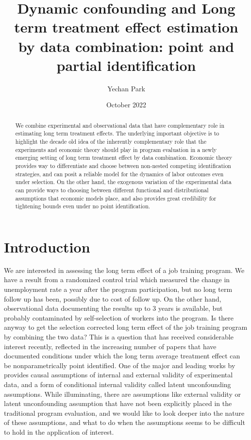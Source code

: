 \documentclass[uplatex,dvipdfmx]{jsarticle}
\title{Dynamic confounding and Long term treatment effect estimation by data combination: point and partial identification}\date{October 2022}\author{Yechan Park}
\begin{document}
\maketitle\tableofcontents
\begin{abstract}
    We combine experimental and observational data that have complementary role in estimating long term treatment effects. The underlying important objective is to highlight the decade old idea of the inherently complementary role that the experiments and economic theory should play in program evaluation in a newly emerging setting of long term treatment effect by data combination. Economic theory provides way to differentiate and choose between non-nested competing identification strategies, and can posit a reliable model for the dynamics of labor outcomes even under selection. On the other hand, the exogenous variation of the experimental data can provide ways to choosing between different functional and distributional assumptions that economic models place, and also provides great credibility for tightening bounds even under no point identification.
\end{abstract}

\section{Introduction}


We are interested in assessing the long term effect of a job training program. We have a result from a randomized control trial which measured the change in unemployment rate a year after the program participation, but no long term follow up has been, possibly due to cost of follow up. On the other hand, observational data documenting the results up to 3 years is available, but probably contaminated by self-selection of workers into the program. Is there anyway to get the selection corrected long term effect of the job training program by combining the two data? This is a question that has received considerable interest recently, reflected in the increasing number of papers that have documented conditions under which the long term average treatment effect can be nonparametrically point identified. One of the major and leading works by \cite{athey2020combining}  provides causal assumptions of internal and external validity of experimental data, and a form of conditional internal validity called latent unconfounding assumptions. While illuminating, there are assumptions like external validity or latent unconfounding assumption that have not been explicitly placed in the traditional program evaluation, and we would like to look deeper into the nature of these assumptions, and what to do when the assumptions seems to be difficult to hold in the application of interest. 
\end{document}
